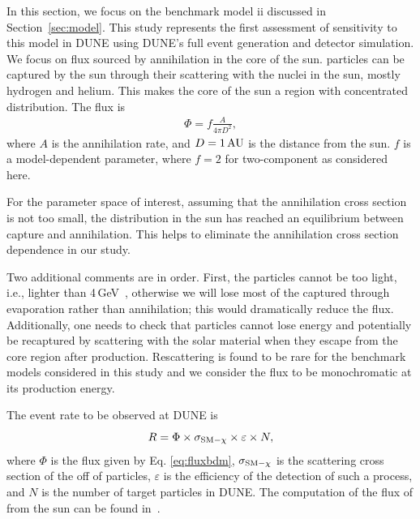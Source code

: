 In this section, we focus on the benchmark model ii discussed in Section~\ref{sec:model}. This study represents the first assessment of sensitivity to this model in DUNE using DUNE's full event generation and detector simulation. We focus on  flux sourced by  annihilation in the core of the sun.   particles can be captured by the sun through their scattering with the nuclei in the sun, mostly hydrogen and helium. This makes the core of the sun a region with concentrated  distribution. The  flux is
\begin{eqnarray} \label{eq:fluxbdm}
\Phi= f \frac{A}{4\pi D^2},
\end{eqnarray}
where $A$ is the annihilation rate, and $D = 1\,\rm{AU}$ is the distance from the sun. $f$ is a model-dependent parameter, where $f = 2$ for two-component  as considered here.

For the parameter space of interest, %
assuming that the 
 annihilation cross section is not too small, the  distribution in the sun has reached an equilibrium between capture and annihilation. This helps to eliminate the annihilation cross section dependence in our study.

Two additional comments are in order. First, the  particles cannot be too light, i.e.,  lighter than 4\,GeV~\cite{Griest:1986yu,Gould:1987ju}, otherwise we will lose most of the captured  through evaporation rather than annihilation; this would dramatically reduce the  flux. Additionally, one needs to check that  particles cannot lose energy and potentially be recaptured by scattering with the solar material when they escape from the core region after production. Rescattering is found to be rare for the benchmark models considered in this study and we consider the  flux to be monochromatic at its production energy.

The event rate to be observed at DUNE is 
\begin{equation}
R = \Phi \times \sigma_{\rm{SM} - \chi} \times \varepsilon \times N,
\end{equation}
 where $\Phi$ is the flux given by Eq. \eqref{eq:fluxbdm}, $\sigma_{\rm{SM} - \chi}$ is the scattering cross section of the  off of  particles, $\varepsilon$ is the efficiency of the detection of such a process, and $N$ is the number of target particles in DUNE. The computation of the flux of  from the sun can be found in~\cite{Berger:2014sqa}. 
 
